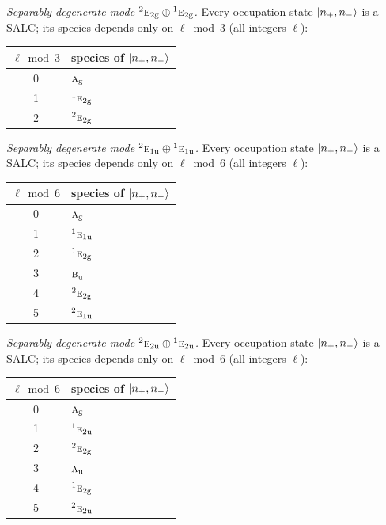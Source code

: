 \documentclass[11pt]{article}
\newcommand{\irr}[1]{\text{\normalfont\scshape #1}}
\newcommand{\conjpair}[1]{{}^{#1}}
\newcommand{\ptag}[1]{\mathrm{#1}}
\begin{document}
\emph{Separably degenerate mode $\conjpair{2}\irr{e}_{2\ptag{g}}\oplus \conjpair{1}\irr{e}_{2\ptag{g}}$.} Every occupation state $\ket{n_+,n_-}$ is a SALC; its species depends only on $\ell\bmod 3$ (all integers $\ell$):
\begin{longtable}{c l}\hline $\ell\bmod 3$ & species of $\ket{n_+,n_-}$\\ \hline\endhead
0 & $\irr{a}_{\ptag{g}}$\\
1 & $\conjpair{1}\irr{e}_{2\ptag{g}}$\\
2 & $\conjpair{2}\irr{e}_{2\ptag{g}}$\\
\hline\end{longtable}

\emph{Separably degenerate mode $\conjpair{2}\irr{e}_{1\ptag{u}}\oplus \conjpair{1}\irr{e}_{1\ptag{u}}$.} Every occupation state $\ket{n_+,n_-}$ is a SALC; its species depends only on $\ell\bmod 6$ (all integers $\ell$):
\begin{longtable}{c l}\hline $\ell\bmod 6$ & species of $\ket{n_+,n_-}$\\ \hline\endhead
0 & $\irr{a}_{\ptag{g}}$\\
1 & $\conjpair{1}\irr{e}_{1\ptag{u}}$\\
2 & $\conjpair{1}\irr{e}_{2\ptag{g}}$\\
3 & $\irr{b}_{\ptag{u}}$\\
4 & $\conjpair{2}\irr{e}_{2\ptag{g}}$\\
5 & $\conjpair{2}\irr{e}_{1\ptag{u}}$\\
\hline\end{longtable}

\emph{Separably degenerate mode $\conjpair{2}\irr{e}_{2\ptag{u}}\oplus \conjpair{1}\irr{e}_{2\ptag{u}}$.} Every occupation state $\ket{n_+,n_-}$ is a SALC; its species depends only on $\ell\bmod 6$ (all integers $\ell$):
\begin{longtable}{c l}\hline $\ell\bmod 6$ & species of $\ket{n_+,n_-}$\\ \hline\endhead
0 & $\irr{a}_{\ptag{g}}$\\
1 & $\conjpair{1}\irr{e}_{2\ptag{u}}$\\
2 & $\conjpair{2}\irr{e}_{2\ptag{g}}$\\
3 & $\irr{a}_{\ptag{u}}$\\
4 & $\conjpair{1}\irr{e}_{2\ptag{g}}$\\
5 & $\conjpair{2}\irr{e}_{2\ptag{u}}$\\
\hline\end{longtable}
\end{document}
